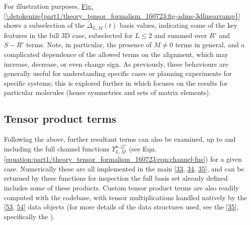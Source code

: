 \documentclass[letterpaper,table,10pt,english]{jupyterBook}
\begin{document}
\sphinxAtStartPar
For illustration purposes, \hyperref[\detokenize{part1/theory_tensor_formalism_160723:fig-adms-3dlinearramp}]{Fig.\@ \ref{\detokenize{part1/theory_tensor_formalism_160723:fig-adms-3dlinearramp}}} shows a subselection of the \(\tilde{\Delta}_{L,M}(t)\) basis values, indicating some of the key features in the full 3D case, subselected for \(L\leq2\) and summed over \(R'\) and \(S-R'\) terms. Note, in particular, the presence of \(M\neq0\) terms in general, and a complicated dependence of the allowed terms on the alignment, which may increase, decrease, or even change sign. As previously, these behaviours are generally useful for understanding specific cases or planning experiments for specific systems; this is explored further in {\hyperref[\detokenize{part2/extracting_matrix_elements_overview_270423:chpt-extracting-matrix-elements-overview}]{}} which focuses on the results for particular molecules (hence symmetries and sets of matrix elements).


\subsection{Tensor product terms}
\label{\detokenize{part1/theory_tensor_formalism_160723:tensor-product-terms}}\label{\detokenize{part1/theory_tensor_formalism_160723:sec-theory-tensor-products}}
\sphinxAtStartPar
Following the above, further resultant terms can also be examined, up to and including the full channel functions \(\varUpsilon_{L,M}^{u,\zeta\zeta'}\) (see Eqn. \eqref{equation:part1/theory_tensor_formalism_160723:eqn:channel-fns}) for a given case. Numerically these are all implemented in the main  {[}\hyperlink{cite.backmatter/bibliography:id666}{33}, \hyperlink{cite.backmatter/bibliography:id608}{34}, \hyperlink{cite.backmatter/bibliography:id606}{35}{]}, and can be returned by these functions for inspection \sphinxhyphen{} the full basis set already defined includes some of these products. Custom tensor product terms are also readily computed with the codebase, with tensor multiplications handled natively by the  {[}\hyperlink{cite.backmatter/bibliography:id698}{53}, \hyperlink{cite.backmatter/bibliography:id975}{54}{]} data objects (for more details of the data structures used, see the  {[}\hyperlink{cite.backmatter/bibliography:id606}{35}{]}, specifically the ).
\end{document}
